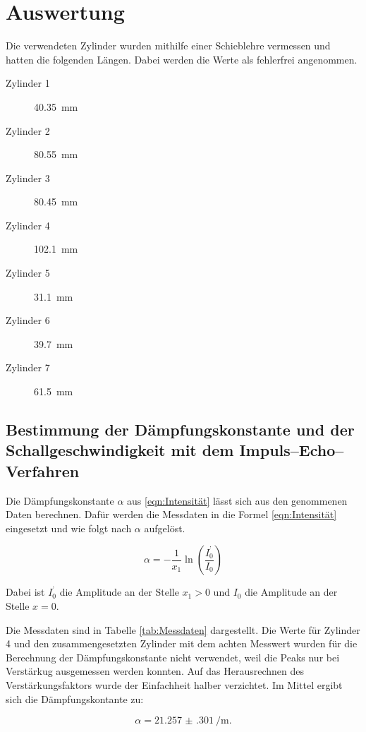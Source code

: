 \section{Auswertung}

Die verwendeten Zylinder wurden mithilfe einer Schieblehre vermessen und
hatten die folgenden Längen. Dabei werden die Werte als fehlerfrei angenommen.

\begin{description}
  \item[Zylinder 1] \SI{40,35}{\milli\meter}
  \item[Zylinder 2] \SI{80,55}{\milli\meter}
  \item[Zylinder 3] \SI{80,45}{\milli\meter}
  \item[Zylinder 4] \SI{102,1}{\milli\meter}
  \item[Zylinder 5] \SI{31,1}{\milli\meter}
  \item[Zylinder 6] \SI{39,7}{\milli\meter}
  \item[Zylinder 7] \SI{61,5}{\milli\meter}
\end{description}

\subsection{Bestimmung der Dämpfungskonstante und der Schallgeschwindigkeit mit dem Impuls--Echo--Verfahren}

Die Dämpfungskonstante $\alpha$ aus \eqref{eqn:Intensität}
lässt sich aus den genommenen Daten berechnen. Dafür werden die Messdaten
in die Formel \eqref{eqn:Intensität} eingesetzt und wie folgt nach $\alpha$ aufgelöst.

\begin{equation}
  \label{eqn:dämpfung}
  \alpha = - \frac{1}{x_1} \ln{\left(\frac{I_0^\text{'}}{I_0}\right)}
\end{equation}

Dabei ist $I_0^\text{'}$ die Amplitude an der Stelle $x_1 > 0$ und $I_0$
die Amplitude an der Stelle $x  = 0$.

Die Messdaten sind in Tabelle \ref{tab:Messdaten} dargestellt.
Die Werte für Zylinder 4 und den zusammengesetzten Zylinder mit dem
achten Messwert wurden für die Berechnung der Dämpfungskonstante nicht
verwendet, weil die Peaks nur bei Verstärkug ausgemessen werden konnten.
Auf das Herausrechnen des Verstärkungsfaktors wurde der Einfachheit halber verzichtet.
Im Mittel ergibt sich die Dämpfungskontante zu:

\begin{equation}
  \alpha = \SI{21.257(301)}{\per\meter}.
\end{equation}

